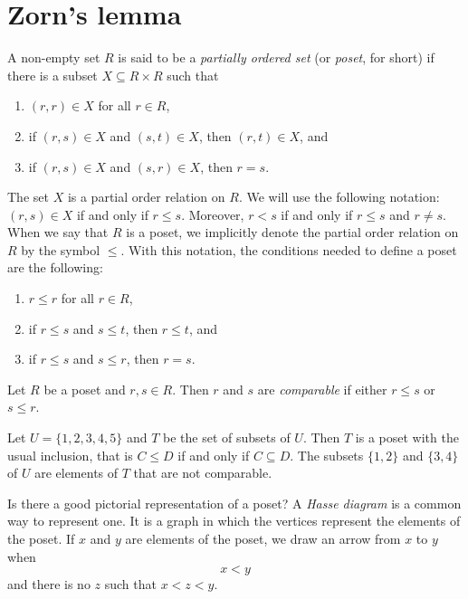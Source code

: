 \section{Zorn's lemma}
\lecture\label{lec:Zorn}

\begin{definition}
A non-empty set $R$ is said to be a \emph{partially ordered set} (or \emph{poset}, for short) 
if there is a subset $X\subseteq R\times R$ such that
\begin{enumerate}
    \item $(r,r)\in X$ for all $r\in R$, 
    \item if $(r,s)\in X$ and $(s,t)\in X$, then $(r,t)\in X$, and 
    \item if $(r,s)\in X$ and $(s,r)\in X$, then $r=s$. 
\end{enumerate}
\end{definition}

The set $X$ is a partial order relation on $R$.  
We will use the following notation: $(r,s)\in X$ if and only if $r\leq s$. Moreover, 
$r<s$ if and only if $r\leq s$ and $r\ne s$. When we say that $R$ is a poset, we implicitly denote the partial order relation on $R$ by the symbol $\leq$. With this notation, the conditions
needed to define a poset are the following:
\begin{enumerate}
    \item $r\leq r$ for all $r\in R$,
    \item if $r\leq s$ and $s\leq t$, then $r\leq t$, and 
    \item if $r\leq s$ and $s\leq r$, then $r=s$. 
\end{enumerate}

\begin{definition}
Let $R$ be a poset and $r,s\in R$. Then $r$ and $s$ are \emph{comparable}
if either $r\leq s$ or $s\leq r$.
\end{definition}

\begin{example}
    Let $U=\{1,2,3,4,5\}$ and $T$ be the set of subsets of $U$. Then $T$ is a poset
    with the usual inclusion, that is $C\leq D$ if and only if $C\subseteq D$. The subsets
    $\{1,2\}$ and $\{3,4\}$ of $U$ are elements of $T$ that are not comparable. 
\end{example}

Is there a good pictorial representation of a poset? A \emph{Hasse diagram} is
a common way to represent one. It is a graph in which the vertices represent
the elements of the poset. If $x$ and $y$ are elements of the poset, we draw an
arrow from $x$ to $y$ when
\[
x<y
\]
and there is no $z$ such that $x<z<y$. 

